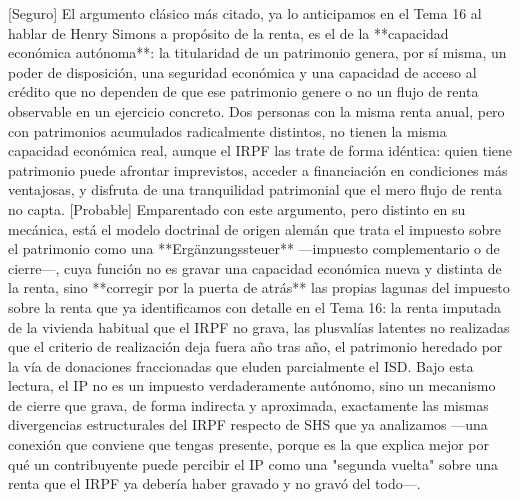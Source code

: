 \documentclass[10pt,a4paper]{article}
\begin{document}
[Seguro] El argumento clásico más citado, ya lo anticipamos en el Tema 16 al hablar de Henry Simons a propósito de la renta, es el de la **capacidad económica autónoma**: la titularidad de un patrimonio genera, por sí misma, un poder de disposición, una seguridad económica y una capacidad de acceso al crédito que no dependen de que ese patrimonio genere o no un flujo de renta observable en un ejercicio concreto. Dos personas con la misma renta anual, pero con patrimonios acumulados radicalmente distintos, no tienen la misma capacidad económica real, aunque el IRPF las trate de forma idéntica: quien tiene patrimonio puede afrontar imprevistos, acceder a financiación en condiciones más ventajosas, y disfruta de una tranquilidad patrimonial que el mero flujo de renta no capta. [Probable] Emparentado con este argumento, pero distinto en su mecánica, está el modelo doctrinal de origen alemán que trata el impuesto sobre el patrimonio como una **Ergänzungssteuer** —impuesto complementario o de cierre—, cuya función no es gravar una capacidad económica nueva y distinta de la renta, sino **corregir por la puerta de atrás** las propias lagunas del impuesto sobre la renta que ya identificamos con detalle en el Tema 16: la renta imputada de la vivienda habitual que el IRPF no grava, las plusvalías latentes no realizadas que el criterio de realización deja fuera año tras año, el patrimonio heredado por la vía de donaciones fraccionadas que eluden parcialmente el ISD. Bajo esta lectura, el IP no es un impuesto verdaderamente autónomo, sino un mecanismo de cierre que grava, de forma indirecta y aproximada, exactamente las mismas divergencias estructurales del IRPF respecto de SHS que ya analizamos —una conexión que conviene que tengas presente, porque es la que explica mejor por qué un contribuyente puede percibir el IP como una "segunda vuelta" sobre una renta que el IRPF ya debería haber gravado y no gravó del todo—.
\end{document}
